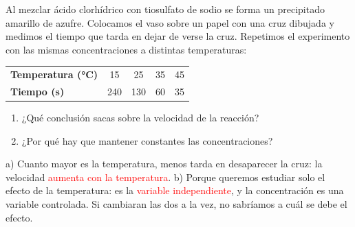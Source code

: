 \begin{exercise}
    Al mezclar ácido clorhídrico con tiosulfato de sodio se forma un precipitado amarillo de azufre. Colocamos el vaso sobre un papel con una cruz dibujada y medimos el tiempo que tarda en dejar de verse la cruz. Repetimos el experimento con las mismas concentraciones a distintas temperaturas:
    \begin{center}
        \begin{tabular}{@{}lcccc@{}}
            \toprule
            \textbf{Temperatura (\unit{\celsius})} & 15 & 25 & 35 & 45 \\[3pt]
            \textbf{Tiempo (\unit{\second})} & 240 & 130 & 60 & 35 \\
            \bottomrule
        \end{tabular}
    \end{center}
    \begin{enumerate}[label=\alph*)]
        \item ¿Qué conclusión sacas sobre la velocidad de la reacción?
        \item ¿Por qué hay que mantener constantes las concentraciones?
    \end{enumerate}
    \begin{solu}
        a) Cuanto mayor es la temperatura, menos tarda en desaparecer la cruz: la velocidad \textcolor{red}{aumenta con la temperatura}.
        b) Porque queremos estudiar solo el efecto de la temperatura: es la \textcolor{red}{variable independiente}, y la concentración es una variable controlada. Si cambiaran las dos a la vez, no sabríamos a cuál se debe el efecto.
    \end{solu}
\end{exercise}

